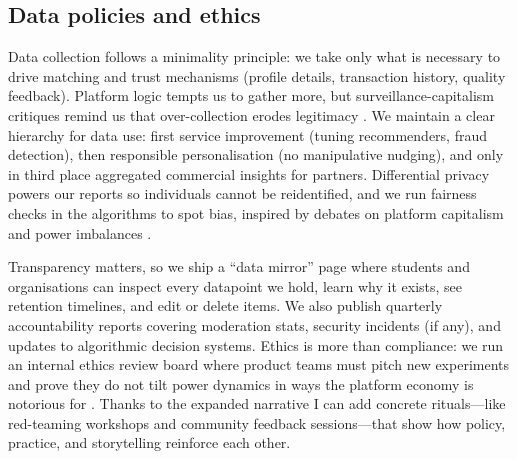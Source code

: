 \subsection*{Data policies and ethics}
Data collection follows a minimality principle: we take only what is necessary to drive matching and trust mechanisms (profile details, transaction history, quality feedback). Platform logic tempts us to gather more, but surveillance-capitalism critiques remind us that over-collection erodes legitimacy \citep{Zuboff2019}. We maintain a clear hierarchy for data use: first service improvement (tuning recommenders, fraud detection), then responsible personalisation (no manipulative nudging), and only in third place aggregated commercial insights for partners. Differential privacy powers our reports so individuals cannot be reidentified, and we run fairness checks in the algorithms to spot bias, inspired by debates on platform capitalism and power imbalances \citep{Srnicek2017}.

Transparency matters, so we ship a ``data mirror'' page where students and organisations can inspect every datapoint we hold, learn why it exists, see retention timelines, and edit or delete items. We also publish quarterly accountability reports covering moderation stats, security incidents (if any), and updates to algorithmic decision systems. Ethics is more than compliance: we run an internal ethics review board where product teams must pitch new experiments and prove they do not tilt power dynamics in ways the platform economy is notorious for \citep{Choudary2016}. Thanks to the expanded narrative I can add concrete rituals---like red-teaming workshops and community feedback sessions---that show how policy, practice, and storytelling reinforce each other.
